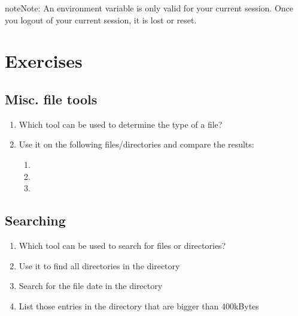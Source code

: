 \documentclass[letterpaper,10pt,english]{sphinxmanual}
\begin{document}
\begin{notice}{note}{Note:}
An environment variable is only valid for your current session. Once you logout of your current session, it is lost or reset.
\end{notice}


\chapter{Exercises}
\label{exercises_beginner:exercises}\label{exercises_beginner::doc}

\section{Misc. file tools}
\label{exercises_beginner:misc-file-tools}\begin{enumerate}
\item {} 
Which tool can be used to determine the type of a file?

\item {} 
Use it on the following files/directories and compare the results:
\begin{enumerate}
\item {} 

\item {} 
\code{\textasciitilde{}}

\item {} 

\end{enumerate}

\end{enumerate}


\section{Searching}
\label{exercises_beginner:searching}\begin{enumerate}
\item {} 
Which tool can be used to search for files or directories?

\item {} 
Use it to find all directories in the  directory

\item {} 
Search for the file date in the  directory

\item {} 
List those entries in the directory  that are bigger than 400kBytes

\end{enumerate}
\end{document}
